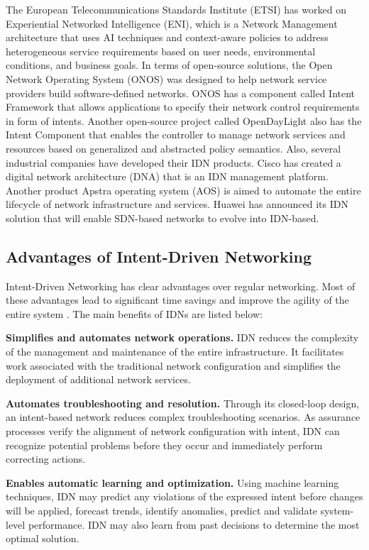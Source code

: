 The European Telecommunications Standards Institute (ETSI) has worked on Experiential Networked Intelligence (ENI), which is a Network Management architecture that uses AI techniques and context-aware policies to address heterogeneous service requirements based on user needs, environmental conditions, and business goals. In terms of open-source solutions, the Open Network Operating System (ONOS) was designed to help network service providers build software-defined networks. ONOS has a component called Intent Framework that allows applications to specify their network control requirements in form of intents. Another open-source project called OpenDayLight also has the Intent Component that enables the controller to manage network services and resources based on generalized and abstracted policy semantics. Also, several industrial companies have developed their IDN products. Cisco has created a digital network architecture (DNA) that is an IDN management platform. Another product Apstra operating system (AOS) is aimed to automate the entire lifecycle of network infrastructure and services. Huawei has announced its IDN solution that will enable SDN-based networks to evolve into IDN-based. \cite{8968429}


\subsection{Advantages of Intent-Driven Networking}

Intent-Driven Networking has clear advantages over regular networking. Most of these advantages lead to significant time savings and improve the agility of the entire system \cite{Kolibri}. The main benefits of IDNs are listed below: \cite[11]{MartinezJulia2022}

\textbf{Simplifies and automates network operations.} IDN reduces the complexity of the management and maintenance of the entire infrastructure. It facilitates work associated with the traditional network configuration and simplifies the deployment of additional network services.

\textbf{Automates troubleshooting and resolution.} Through its closed-loop design, an intent-based network reduces complex troubleshooting scenarios. As assurance processes verify the alignment of network configuration with intent, IDN can recognize potential problems before they occur and immediately perform correcting actions.

\textbf{Enables automatic learning and optimization.} Using machine learning techniques, IDN may predict any violations of the expressed intent before changes will be applied, forecast trends, identify anomalies, predict and validate system-level performance. IDN may also learn from past decisions to determine the most optimal solution.

